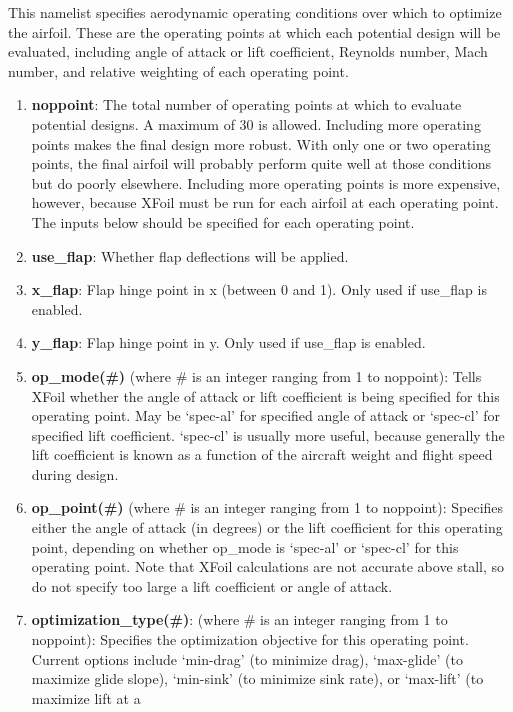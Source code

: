 \documentclass[11pt]{article}
\begin{document}
This namelist specifies aerodynamic operating conditions over which to optimize the
airfoil.  These are the operating points at which each potential design will be evaluated,
including angle of attack or lift coefficient, Reynolds number, Mach number, and
relative weighting of each operating point.

\begin{enumerate}
\item{\textbf{noppoint}: The total number of operating points at which to evaluate
potential designs.  A maximum of 30 is allowed.  Including more operating points makes the
final design more robust.  With only one or two operating points, the final airfoil will
probably perform quite well at those conditions but do poorly elsewhere.  Including more
operating points is more expensive, however, because XFoil must be run for each airfoil at
each operating point.  The inputs below should be specified for each operating point.}
\item{\textbf{use\_flap}: Whether flap deflections will be applied.}
\item{\textbf{x\_flap}: Flap hinge point in x (between 0 and 1). Only used if use\_flap is
enabled.}
\item{\textbf{y\_flap}: Flap hinge point in y. Only used if use\_flap is enabled.}
\item{\textbf{op\_mode(\#)} (where \# is an integer ranging from 1 to noppoint): Tells
XFoil whether the angle of attack or lift coefficient is being specified for this
operating point.  May be `spec-al' for specified angle of attack or `spec-cl' for
specified lift coefficient. `spec-cl' is usually more useful, because generally the lift
coefficient is known as a function of the aircraft weight and flight speed during design.}
\item{\textbf{op\_point(\#)} (where \# is an integer ranging from 1 to noppoint):
Specifies either the angle of attack (in degrees) or the lift coefficient for this
operating point, depending on whether op\_mode is `spec-al' or `spec-cl' for this
operating point.  Note that XFoil calculations are not accurate above stall, so do not
specify too large a lift coefficient or angle of attack.}
\item{\textbf{optimization\_type(\#)}: (where \# is an integer ranging from 1 to
noppoint): Specifies the optimization objective for this operating point. Current options 
include `min-drag' (to minimize drag), `max-glide' (to maximize 
glide slope), `min-sink' (to minimize sink rate), or `max-lift' (to maximize lift at a
}
\end{enumerate}
\end{document}
